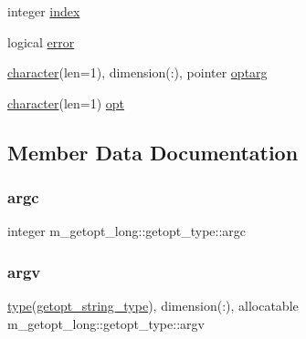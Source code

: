 \begin{DoxyCompactItemize}
\item 
integer \hyperlink{structm__getopt__long_1_1getopt__type_a02b3dc6e47301677812cad9a6160033e}{index}
\item 
logical \hyperlink{structm__getopt__long_1_1getopt__type_a4558004f007b7c97ded6b52c27e0a383}{error}
\item 
\hyperlink{option__stopwatch_83_8txt_abd4b21fbbd175834027b5224bfe97e66}{character}(len=1), dimension(\+:), pointer \hyperlink{structm__getopt__long_1_1getopt__type_a13987d3bac45e87c5102ebdfdc433aef}{optarg}
\item 
\hyperlink{option__stopwatch_83_8txt_abd4b21fbbd175834027b5224bfe97e66}{character}(len=1) \hyperlink{structm__getopt__long_1_1getopt__type_a4cba432279aa63b2154dba752caedd31}{opt}
\end{DoxyCompactItemize}


\subsection{Member Data Documentation}
\mbox{\label{structm__getopt__long_1_1getopt__type_a91780331d8db9ac26256228dded982e8}} 
\subsubsection{\texorpdfstring{argc}{argc}}
{\footnotesize\ttfamily integer m\+\_\+getopt\+\_\+long\+::getopt\+\_\+type\+::argc}

\mbox{\label{structm__getopt__long_1_1getopt__type_a4210844e9676acb71fe72b0d684d7b67}} 
\subsubsection{\texorpdfstring{argv}{argv}}
{\footnotesize\ttfamily \hyperlink{stop__watch_83_8txt_a70f0ead91c32e25323c03265aa302c1c}{type}(\hyperlink{structm__getopt__long_1_1getopt__string__type}{getopt\+\_\+string\+\_\+type}), dimension(\+:), allocatable m\+\_\+getopt\+\_\+long\+::getopt\+\_\+type\+::argv}

